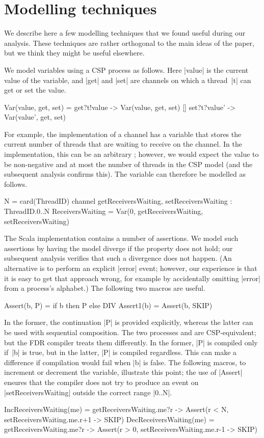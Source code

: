\section{Modelling techniques}

\inlineCSP

We describe here a few modelling techniques that we found useful during our
analysis.  These techniques are rather orthogonal to the main ideas of the
paper, but we think they might be useful elsewhere. 

We model variables using a CSP process as follows.  Here |value| is the
current value of the variable, and |get| and |set| are channels on which a
thread~|t| can get or set the value.
%
\begin{cspm}
Var(value, get, set) = 
  get?t!value -> Var(value, get, set)
  [] set?t?value' -> Var(value', get, set)
\end{cspm}
%
For example, the implementation of a channel has a variable
 that stores the current number of threads that are
waiting to receive on the channel.  In the implementation, this can be an
arbitrary ; however, we would expect the value to be non-negative
and at most the number of threads in the CSP model (and the subsequent
analysis confirms this).  The variable can therefore be modelled as follows. 
%
\begin{cspm}
N = card(ThreadID)
channel getReceiversWaiting, setReceiversWaiting : ThreadID.{0..N}
ReceiversWaiting = Var(0, getReceiversWaiting, setReceiversWaiting)
\end{cspm}

The Scala implementation contains a number of assertions.  We model such
assertions by having the model diverge if the property does not hold; our
subsequent analysis verifies that such a divergence does not happen.  (An
alternative is to perform an explicit |error| event; however, our experience
is that it is easy to get that approach wrong, for example by accidentally
omitting |error| from a process's alphabet.)  The following two macros are
useful.
%
\begin{cspm}
Assert(b, P) = if b then P else DIV
Assert1(b) = Assert(b, SKIP)
\end{cspm}
%
In the former, the continuation |P| is provided explicitly, whereas the latter
can be used with sequential composition.  The two processes  and  are CSP-equivalent; but the FDR compiler treats
them differently.  In the former, |P| is compiled only if~|b| is true, but in
the latter, |P| is compiled regardless.  This can make a difference if
compilation would fail when |b| is false.  The following macros, to increment
or decrement the  variable, illustrate this point; the
use of |Assert| ensures that the compiler does not try to produce an event on
|setReceiversWaiting| outside the correct range |{0..N}|.
%
\begin{cspm}
IncReceiversWaiting(me) = 
  getReceiversWaiting.me?r -> Assert(r < N, setReceiversWaiting.me.r+1 -> SKIP)
DecReceiversWaiting(me) =
  getReceiversWaiting.me?r -> Assert(r > 0, setReceiversWaiting.me.r-1 -> SKIP)
\end{cspm}

